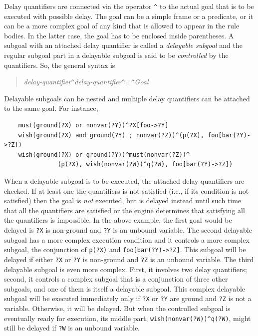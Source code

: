 \documentclass[11pt]{article}
\begin{document}
Delay quantifiers are connected via the operator \texttt{\^} to the actual
goal that is to be executed with possible delay. The goal can be a simple
frame or a predicate, or it can be a more complex goal of any kind that
is allowed to appear in the rule bodies. In the latter case, the goal has
to be enclosed inside parentheses. A subgoal with an attached delay
quantifier is called a \emph{delayable subgoal}
and the regular subgoal part in a delayable subgoal is said to be
\emph{controlled} by the quantifiers.  So, the general syntax is
\begin{quote}
   \emph{delay-quantifier}\texttt{\^}\emph{delay-quantifier}\texttt{\^}...\texttt{\^}\emph{Goal}  
\end{quote}
Delayable subgoals can be
nested and multiple delay quantifiers can be attached to the same goal.
For instance, 
\begin{verbatim}
    must(ground(?X) or nonvar(?Y))^?X[foo->?Y]
    wish(ground(?X) and ground(?Y) ; nonvar(?Z))^(p(?X), foo[bar(?Y)->?Z])
    wish(ground(?X) or ground(?Y))^must(nonvar(?Z))^
               (p(?X), wish(nonvar(?W))^q(?W), foo[bar(?Y)->?Z])
\end{verbatim}
When a delayable subgoal is to be executed, the attached delay quantifiers
are checked. If at least one the quantifiers is not satisfied (i.e., if its
condition is not satisfied) then the goal is \emph{not} executed, but is
delayed instead until such time that all the quantifiers are satisfied or
the engine determines that satisfying all the quantifiers is impossible.
In the above example, the first goal would be delayed is \texttt{?X} is
non-ground and \texttt{?Y} is an unbound variable. The second delayable
subgoal has a more complex execution condition and it controls a more
complex subgoal, the conjunction of \texttt{p(?X)} and
\texttt{foo[bar(?Y)->?Z]}.  This subgoal will be delayed if either
\texttt{?X} or \texttt{?Y} is non-ground and \texttt{?Z} is an unbound
variable. The third delayable subgoal is even more complex. First, it
involves two delay quantifiers; second, it controls a complex subgoal that
is a conjunction of three other subgoals, and one of them is itself a
delayable subgoal.  This complex delayable subgoal will be executed
immediately only if \texttt{?X} or \texttt{?Y} are ground and \texttt{?Z}
is not a variable.  Otherwise, it will be delayed. But when the controlled
subgoal is eventually ready for execution, its middle part,
\texttt{wish(nonvar(?W))\^{}q(?W)}, might still be delayed if \texttt{?W}
is an unbound variable.
\end{document}
